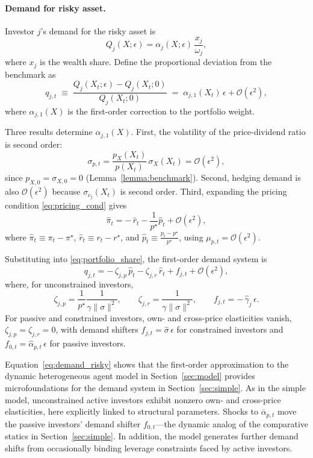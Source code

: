 \documentclass[12pt,english]{article}
\begin{document}
\paragraph{Demand for risky asset.}  
Investor $j$’s demand for the risky asset is 
\[
    Q_j(X;\epsilon)=\alpha_j(X;\epsilon)\,\frac{x_j}{\omega_j},
\]
where $x_j$ is the wealth share. Define the proportional deviation from the benchmark as
\begin{equation}
    q_{j,t}\;\equiv\;\frac{Q_j(X_t;\epsilon)- Q_j(X_t;0)}{Q_j(X_t;0)}
    \;=\;\alpha_{j,1}(X_t)\,\epsilon+\mathcal{O}(\epsilon^2),
\end{equation}
where $\alpha_{j,1}(X)$ is the first-order correction to the portfolio weight.  

Three results determine $\alpha_{j,1}(X)$. First, the volatility of the price-dividend ratio is second order:
\[
    \sigma_{p,t}=\frac{p_X(X_t)}{p(X_t)}\,\sigma_X(X_t)=\mathcal{O}(\epsilon^2),
\]
since $p_{X,0}=\sigma_{X,0}=0$ (Lemma~\ref{lemma:benchmark}). Second, hedging demand is also $\mathcal{O}(\epsilon^2)$ because $\sigma_{c_j}(X_t)$ is second order. Third, expanding the pricing condition \eqref{eq:pricing_cond} gives
\begin{equation}
    \hat{\pi}_t=-\,\hat{r}_t-\frac{1}{p^\star}\hat{p}_t+\mathcal{O}(\epsilon^2),
\end{equation}
where $\hat{\pi}_t\equiv \pi_t-\pi^\star$, $\hat{r}_t\equiv r_t-r^\star$, and $\hat{p}_t\equiv \frac{p_t-p^\star}{p^\star}$, using $\mu_{p,t}=\mathcal{O}(\epsilon^2)$.

Substituting into \eqref{eq:portfolio_share}, the first-order demand system is
\begin{equation}\label{eq:demand_risky}
    q_{j,t}=-\,\zeta_{j,p}\,\hat{p}_t-\zeta_{j,r}\,\hat{r}_t+f_{j,t}+\mathcal{O}(\epsilon^2),
\end{equation}
where, for unconstrained investors,
\[
    \zeta_{j,p}=\frac{1}{p^\star}\frac{1}{\gamma\|\sigma\|^2}, 
    \qquad
    \zeta_{j,r}=\frac{1}{\gamma\|\sigma\|^2}, 
    \qquad
    f_{j,t}=-\,\hat{\gamma}_j\,\epsilon.
\]
For passive and constrained investors, own- and cross-price elasticities vanish, $\zeta_{j,p}=\zeta_{j,r}=0$, with demand shifters $f_{j,t}=\hat{\sigma}\,\epsilon$ for constrained investors and $f_{0,t}=\hat{\alpha}_{p,t}\,\epsilon$ for passive investors.  

Equation~\eqref{eq:demand_risky} shows that the first-order approximation to the dynamic heterogeneous agent model in Section~\ref{sec:model} provides microfoundations for the demand system in Section~\ref{sec:simple}. As in the simple model, unconstrained active investors exhibit nonzero own- and cross-price elasticities, here explicitly linked to structural parameters. Shocks to $\overline{\alpha}_{p,t}$ move the passive investors’ demand shifter $f_{0,t}$—the dynamic analog of the comparative statics in Section~\ref{sec:simple}. In addition, the model generates further demand shifts from occasionally binding leverage constraints faced by active investors.
\end{document}
